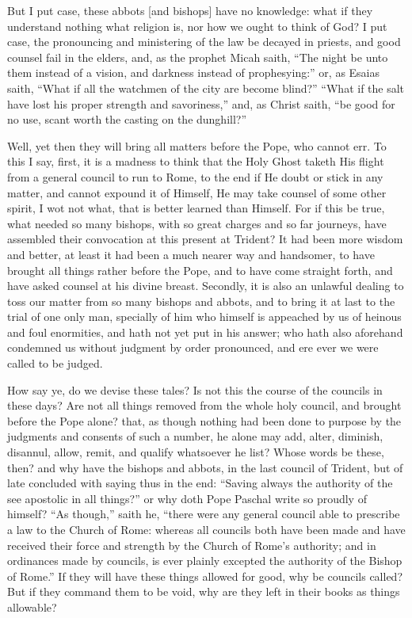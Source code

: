 But I put case, these abbots [and bishops] have no knowledge: what
if they understand nothing what religion is, nor how we ought to think
of God? I put case, the pronouncing and ministering of the law
be decayed in priests, and good counsel fail in the elders, and, as
the prophet Micah saith, “The night be unto them instead of a
vision, and darkness instead of prophesying:” or, as Esaias saith,
“What
if all the watchmen of the city are become blind?” “What
if the salt have lost his proper strength and savoriness,” and,
as Christ saith, “be good for no use, scant worth the casting
on the dunghill?”

Well, yet then they will bring all matters before the Pope, who cannot
err. To this I say, first, it is a madness to think that the Holy
Ghost taketh His flight from a general council to run to Rome, to the
end if He doubt or stick in any matter, and cannot expound it of Himself,
He may take counsel of some other spirit, I wot not what, that is better
learned than Himself. For if this be true, what needed so many
bishops, with so great charges and so far journeys, have assembled their
convocation at this present at Trident? It had been more wisdom
and better, at least it had been a much nearer way and handsomer, to
have brought all things rather before the Pope, and to have come straight
forth, and have asked counsel at his divine breast. Secondly,
it is also an unlawful dealing to toss our matter from so many bishops
and abbots, and to bring it at last to the trial of one only man, specially
of him who himself is appeached by us of heinous and foul enormities,
and hath not yet put in his answer; who hath also aforehand condemned
us
without judgment by order pronounced, and ere ever we were called to
be judged.

How say ye, do we devise these tales? Is not this the course
of the councils in these days? Are not all things removed from
the whole holy council, and brought before the Pope alone? that, as
though nothing had been done to purpose by the judgments and consents
of such a number, he alone may add, alter, diminish, disannul, allow,
remit, and qualify whatsoever he list? Whose words be these, then?
and why have the bishops and abbots, in the last council of Trident,
but of late concluded with saying thus in the end: “Saving always
the authority of the see apostolic in all things?” or why doth
Pope Paschal write so proudly of himself? “As though,”
saith he, “there were any general council able to prescribe a
law to the Church of Rome: whereas all councils both have been made
and have received their force and strength by the Church of Rome’s
authority; and in ordinances made by councils, is ever plainly excepted
the authority of the Bishop of Rome.” If they will have
these things allowed for good, why be councils called? But if
they command them to be void, why are they left in their books as things
allowable?

